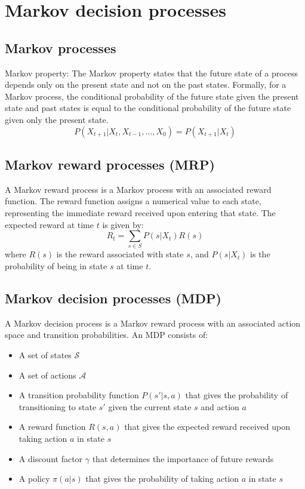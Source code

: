 \section{Markov decision processes}

\subsection{Markov processes}

Markov property:
The Markov property states that the future state of a process depends only on the present state and not on the past states.
Formally, for a Markov process, the conditional probability of the future state given the present state and past states is equal to the conditional probability of the future state given only the present state.
\begin{equation}
    P(X_{t+1} | X_t, X_{t-1}, \ldots, X_0) = P(X_{t+1} | X_t)
\end{equation}

\subsection{Markov reward processes (MRP)}

A Markov reward process is a Markov process with an associated reward function.
The reward function assigns a numerical value to each state, representing the immediate reward received upon entering that state.
The expected reward at time \( t \) is given by:
\begin{equation}
    R_t = \sum_{s \in S} P(s | X_t) R(s)
\end{equation}
where \( R(s) \) is the reward associated with state \( s \), and \( P(s | X_t) \) is the probability of being in state \( s \) at time \( t \).

\subsection{Markov decision processes (MDP)}

A Markov decision process is a Markov reward process with an associated action space and transition probabilities.
An MDP consists of:
\begin{itemize}
    \item A set of states \( \mathcal{S} \)
    \item A set of actions \( \mathcal{A} \)
    \item A transition probability function \( P(s' | s, a) \) that gives the probability of transitioning to state \( s' \) given the current state \( s \) and action \( a \)
    \item A reward function \( R(s, a) \) that gives the expected reward received upon taking action \( a \) in state \( s \)
    \item A discount factor \( \gamma \) that determines the importance of future rewards
    \item A policy \( \pi(a | s) \) that gives the probability of taking action \( a \) in state \( s \)
\end{itemize}

